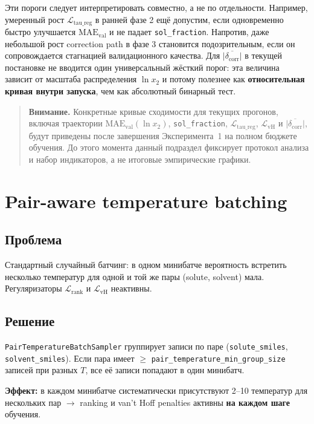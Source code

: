 \documentclass[11pt]{article}
\newcommand{\warnnote}[1]{\begin{quote}\textbf{Внимание.} #1\end{quote}}
\begin{document}
Эти пороги следует интерпретировать совместно, а не по отдельности. Например, умеренный рост $\mathcal{L}_{\mathrm{tau\_reg}}$ в ранней фазе 2 ещё допустим, если одновременно быстро улучшается $\mathrm{MAE}_{\mathrm{val}}$ и не падает \texttt{sol\_fraction}. Напротив, даже небольшой рост correction path в фазе 3 становится подозрительным, если он сопровождается стагнацией валидационного качества. Для $\overline{|\delta_{\mathrm{corr}}|}$ в текущей постановке не вводится один универсальный жёсткий порог: эта величина зависит от масштаба распределения $\ln x_2$ и потому полезнее как \textbf{относительная кривая внутри запуска}, чем как абсолютный бинарный тест.

\warnnote{Конкретные кривые сходимости для текущих прогонов, включая траектории $\mathrm{MAE}_{\mathrm{val}}(\ln x_2)$, \texttt{sol\_fraction}, $\mathcal{L}_{\mathrm{tau\_reg}}$, $\mathcal{L}_{\mathrm{vH}}$ и $\overline{|\delta_{\mathrm{corr}}|}$, будут приведены после завершения Эксперимента~1 на полном бюджете обучения. До этого момента данный подраздел фиксирует протокол анализа и набор индикаторов, а не итоговые эмпирические графики.}

\section{Pair-aware temperature batching}

\subsection{Проблема}

Стандартный случайный батчинг: в одном минибатче вероятность встретить несколько температур для одной и той же пары (solute, solvent) мала. Регуляризаторы $\mathcal{L}_{\mathrm{rank}}$ и $\mathcal{L}_{\mathrm{vH}}$ неактивны.

\subsection{Решение}

\texttt{PairTemperatureBatchSampler} группирует записи по паре (\texttt{solute\_smiles}, \texttt{solvent\_smiles}). Если пара имеет $\geq$ \texttt{pair\_temperature\_min\_group\_size} записей при разных $T$, все её записи попадают в один минибатч.

\textbf{Эффект:} в каждом минибатче систематически присутствуют 2--10 температур для нескольких пар $\to$ ranking и van't Hoff penalties активны \textbf{на каждом шаге} обучения.
\end{document}
